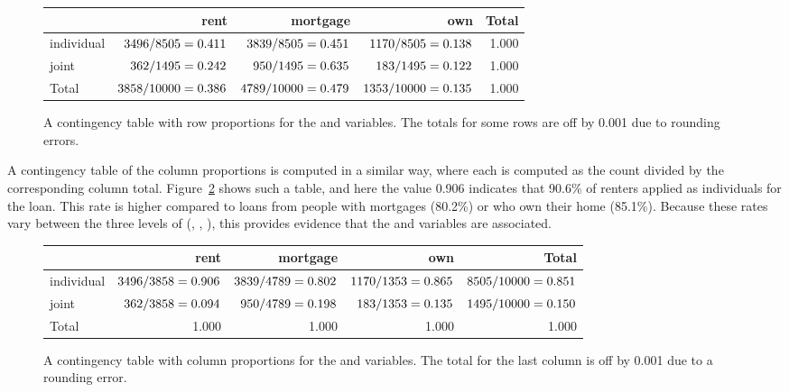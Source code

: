 \begin{figure}
\centering
\begin{tabular}{l rrr r}
  \hline
 & rent & mortgage & own & Total \\
  \hline
individual & 
    $3496{}/8505{} = 0.411$ &
    $3839{}/8505{} = 0.451$ &
    $1170{}/8505{} = 0.138$ &
    1.000 \\
joint &
    $362{}/1495{} = 0.242$ &
    $950{}/1495{} = 0.635$ &
    $183{}/1495{} = 0.122$ &
    1.000 \\
   \hline
Total &
    $3858{}/10000{} = 0.386$ &
    $4789{}/10000{} = 0.479$ &
    $1353{}/10000{} = 0.135$ &
    1.000 \\
  \hline
\end{tabular}
\caption{A contingency table with row proportions for the
   and  variables.
  The totals for some rows are off by 0.001 due to rounding errors.}
\label{rowPropAppTypeHomeownership}
\end{figure}

A contingency table of the column proportions is computed in a similar way, where each  is computed as the count divided by the corresponding column total. Figure~\ref{colPropAppTypeHomeownership} shows such a table, and here the value 0.906 indicates that 90.6\% of renters applied as individuals for the loan. This rate is higher compared to loans from people with mortgages (80.2\%) or who own their home (85.1\%). Because these rates vary between the three levels of  (, , ), this provides evidence that the  and  variables are associated.

\begin{figure}[h]
\centering\small
\begin{tabular}{l rrr r}
  \hline
 & rent & mortgage & own & Total \\
  \hline
individual &
    $3496{}/3858{} = 0.906$ &
    $3839{}/4789{} = 0.802$ &
    $1170{}/1353{} = 0.865$ &
    $8505{}/10000{} = 0.851$ \\
joint &
    $362{}/3858{} = 0.094$ &
    $950{}/4789{} = 0.198$ &
    $183{}/1353{} = 0.135$ &
    $1495{}/10000{} = 0.150$ \\
   \hline
Total & 1.000 & 1.000 & 1.000 & 1.000 \\
   \hline
\end{tabular}
\caption{A contingency table with column proportions for the
   and  variables.
  The total for the last column is off by 0.001 due
  to a rounding error.}
\label{colPropAppTypeHomeownership}
\end{figure}

